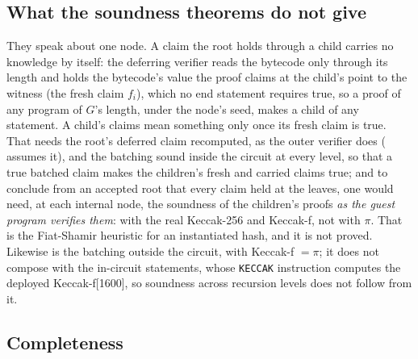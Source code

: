 \documentclass[11pt]{article}
\begin{document}
\subsection{What the soundness theorems do not give}\label{sec:notgive}

They speak about one node. A claim the root holds through a child carries no knowledge by itself:
the deferring verifier reads the bytecode only through its length and holds the bytecode's value
the proof claims at the child's point to the witness (the fresh claim $f_i$), which no end statement
requires true, so
a proof of any program of $G$'s length, under the node's seed, makes a child of any statement. A
child's claims mean something only once its fresh claim is true. That needs the root's deferred
claim recomputed, as the outer verifier does ( assumes it), and the batching
sound inside the circuit at every level, so that a true batched claim makes the children's fresh and
carried claims true; and to conclude from an accepted root that every claim held at the leaves, one
would need, at each internal node, the soundness of the children's proofs \emph{as the guest
program verifies them}: with the real Keccak-256 and Keccak-f, not with $\pi$. That is the
Fiat-Shamir heuristic for an instantiated hash, and it is not proved. Likewise  is
the batching outside the circuit, with Keccak-f $= \pi$; it does not compose with the in-circuit
statements, whose \texttt{KECCAK} instruction computes the deployed Keccak-f[1600], so soundness
across recursion levels does not follow from it.

\subsection{Completeness}
\end{document}
